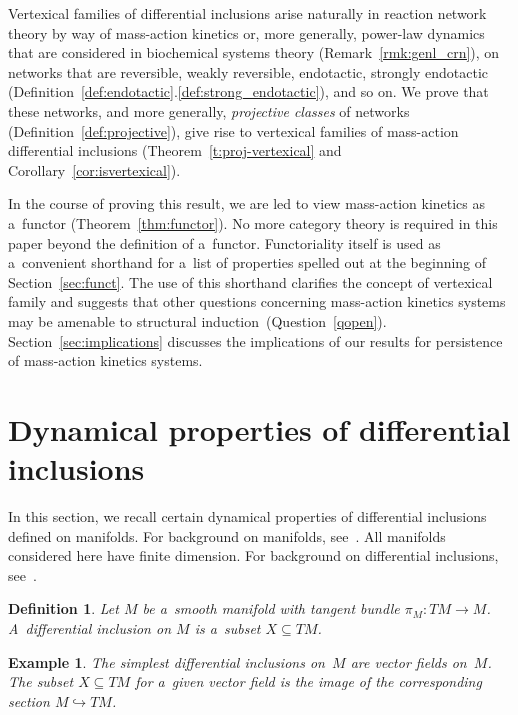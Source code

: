 \documentclass[pdftex]{sigma}
\newtheorem{Definition}[Theorem]{Definition}
\newtheorem{Example}[Theorem]{Example}
\begin{document}
Vertexical families of dif\/ferential inclusions arise naturally in reaction network theory by way of mass-action
kinetics or, more generally, power-law dynamics that are considered in biochemical systems theory
(Remark~\ref{rmk:genl_crn}), on networks that are reversible, weakly reversible, endotactic, strongly endotactic
(Def\/inition~\ref{def:endotactic}.\ref{def:strong_endotactic}), and so on.
We prove that these networks, and more generally, \emph{projective classes} of networks
(Def\/inition~\ref{def:projective}), give rise to vertexical families of mass-action dif\/ferential inclusions
(Theorem~\ref{t:proj-vertexical} and Corollary~\ref{cor:isvertexical}).

In the course of proving this result, we are led to view mass-action kinetics as a~functor (Theo\-rem~\ref{thm:functor}).
No more category theory is required in this paper beyond the def\/inition of a~functor.
Functoriality itself is used as a~convenient shorthand for a~list of properties spelled out at the beginning of
Section~\ref{sec:funct}.
The use of this shorthand clarif\/ies the concept of vertexical family and suggests that other questions concerning
mass-action kinetics systems may be amenable to structural induction~(Question~\ref{qopen}).
Section~\ref{sec:implications} discusses the implications of our results for persistence of mass-action kinetics
systems.

\section{Dynamical properties of dif\/ferential inclusions}\label{s:dynamical}

In this section, we recall certain dynamical properties of dif\/ferential inclusions def\/ined on ma\-ni\-folds.
For background on manifolds, see~\cite{Lee02smooth}.
All manifolds considered here have f\/inite dimension.
For background on dif\/ferential inclusions, see~\cite{Aubin}.
\begin{Definition}\label{def:diff_incl}
Let $M$ be a~smooth manifold with tangent bundle $\pi_M:TM\to M$.
A~\emph{dif\-fe\-ren\-tial inclusion} on $M$ is a~subset $X\subseteq TM$.
\end{Definition}

\begin{Example}\label{e:vectorfield}
The simplest dif\/ferential inclusions on~$M$ are vector f\/ields on~$M$.
The subset $X\subseteq TM$ for a~given vector f\/ield is the image of the corresponding section $M\hookrightarrow TM$.
\end{Example}
\end{document}
